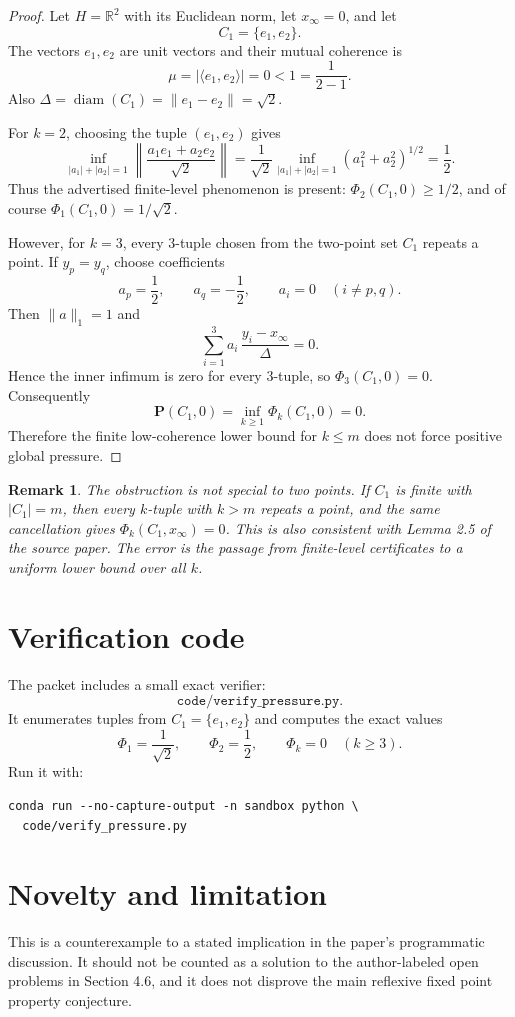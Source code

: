 \documentclass[11pt]{article}
\newtheorem{remark}{Remark}
\begin{document}
\begin{proof}
Let \(H=\mathbb R^2\) with its Euclidean norm, let \(x_\infty=0\), and let
\[
  C_1=\{e_1,e_2\}.
\]
The vectors \(e_1,e_2\) are unit vectors and their mutual coherence is
\[
  \mu=|\langle e_1,e_2\rangle|=0<1=\frac{1}{2-1}.
\]
Also \(\Delta=\operatorname{diam}(C_1)=\|e_1-e_2\|=\sqrt 2\).

For \(k=2\), choosing the tuple \((e_1,e_2)\) gives
\[
  \inf_{|a_1|+|a_2|=1}
  \left\|
    \frac{a_1e_1+a_2e_2}{\sqrt2}
  \right\|
  =
  \frac{1}{\sqrt2}
  \inf_{|a_1|+|a_2|=1}(a_1^2+a_2^2)^{1/2}
  =
  \frac{1}{2}.
\]
Thus the advertised finite-level phenomenon is present: \(\Phi_2(C_1,0)\ge 1/2\), and of course \(\Phi_1(C_1,0)=1/\sqrt2\).

However, for \(k=3\), every 3-tuple chosen from the two-point set \(C_1\) repeats a point.  If \(y_p=y_q\), choose coefficients
\[
  a_p=\frac{1}{2},\qquad a_q=-\frac{1}{2},\qquad a_i=0\quad (i\ne p,q).
\]
Then \(\|a\|_1=1\) and
\[
  \sum_{i=1}^3 a_i\,\frac{y_i-x_\infty}{\Delta}=0.
\]
Hence the inner infimum is zero for every 3-tuple, so \(\Phi_3(C_1,0)=0\).  Consequently
\[
  \mathbf P(C_1,0)=\inf_{k\ge1}\Phi_k(C_1,0)=0.
\]
Therefore the finite low-coherence lower bound for \(k\le m\) does not force positive global pressure.
\end{proof}

\begin{remark}
The obstruction is not special to two points.  If \(C_1\) is finite with \(|C_1|=m\), then every \(k\)-tuple with \(k>m\) repeats a point, and the same cancellation gives \(\Phi_k(C_1,x_\infty)=0\).  This is also consistent with Lemma 2.5 of the source paper.  The error is the passage from finite-level certificates to a uniform lower bound over all \(k\).
\end{remark}

\section*{Verification code}

The packet includes a small exact verifier:
\[
\texttt{code/verify\_pressure.py}.
\]
It enumerates tuples from \(C_1=\{e_1,e_2\}\) and computes the exact values
\[
  \Phi_1=\frac{1}{\sqrt2},\qquad \Phi_2=\frac{1}{2},\qquad \Phi_k=0\quad(k\ge3).
\]
Run it with:
\begin{verbatim}
conda run --no-capture-output -n sandbox python \
  code/verify_pressure.py
\end{verbatim}

\section*{Novelty and limitation}

This is a counterexample to a stated implication in the paper's programmatic discussion.  It should not be counted as a solution to the author-labeled open problems in Section 4.6, and it does not disprove the main reflexive fixed point property conjecture.
\end{document}
